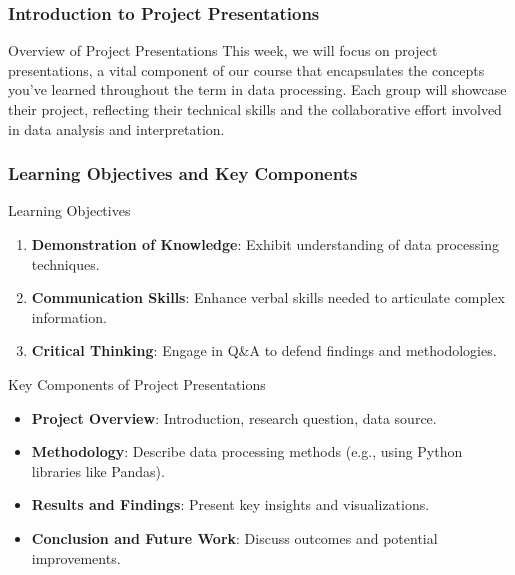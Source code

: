 \documentclass[aspectratio=169]{beamer}
\begin{document}
\frame{\titlepage}

\begin{frame}[fragile]
    \frametitle{Introduction to Project Presentations}
    \begin{block}{Overview of Project Presentations}
        This week, we will focus on project presentations, a vital component of our course that encapsulates the concepts you've learned throughout the term in data processing. Each group will showcase their project, reflecting their technical skills and the collaborative effort involved in data analysis and interpretation.
    \end{block}
\end{frame}

\begin{frame}[fragile]
    \frametitle{Learning Objectives and Key Components}
    \begin{block}{Learning Objectives}
        \begin{enumerate}
            \item \textbf{Demonstration of Knowledge}: Exhibit understanding of data processing techniques.
            \item \textbf{Communication Skills}: Enhance verbal skills needed to articulate complex information.
            \item \textbf{Critical Thinking}: Engage in Q\&A to defend findings and methodologies.
        \end{enumerate}
    \end{block}

    \begin{block}{Key Components of Project Presentations}
        \begin{itemize}
            \item \textbf{Project Overview}: Introduction, research question, data source.
            \item \textbf{Methodology}: Describe data processing methods (e.g., using Python libraries like Pandas).
            \item \textbf{Results and Findings}: Present key insights and visualizations.
            \item \textbf{Conclusion and Future Work}: Discuss outcomes and potential improvements.
        \end{itemize}
    \end{block}
\end{frame}
\end{document}
